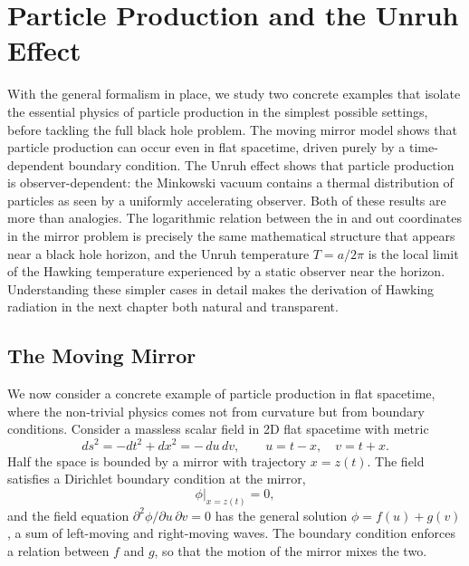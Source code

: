 \chapter{Particle Production and the Unruh Effect}
\label{ch:particle-production-unruh}
With the general formalism in place, we study two concrete examples
that isolate the essential physics of particle production in the
simplest possible settings, before tackling the full black hole
problem. The moving mirror model shows that particle production can
occur even in flat spacetime, driven purely by a time-dependent
boundary condition. The Unruh effect shows that particle production is
observer-dependent: the Minkowski vacuum contains a thermal
distribution of particles as seen by a uniformly accelerating observer.
Both of these results are more than analogies. The logarithmic relation
between the in and out coordinates in the mirror problem is precisely
the same mathematical structure that appears near a black hole horizon,
and the Unruh temperature $T = a/2\pi$ is the local limit of the
Hawking temperature experienced by a static observer near the horizon.
Understanding these simpler cases in detail makes the derivation of
Hawking radiation in the next chapter both natural and transparent.

\section{The Moving Mirror}

We now consider a concrete example of particle production in flat
spacetime, where the non-trivial physics comes not from curvature but
from boundary conditions. Consider a massless scalar field in 2D flat
spacetime with metric
\begin{equation}
	ds^2 = -dt^2 + dx^2 = -\,du\,dv,
	\qquad u = t-x,\quad v = t+x.
\end{equation}
Half the space is bounded by a mirror with trajectory $x = z(t)$. The
field satisfies a Dirichlet boundary condition at the mirror,
\begin{equation}
	\phi\big|_{x=z(t)} = 0,
\end{equation}
and the field equation $\partial^2\phi/\partial u\,\partial v = 0$
has the general solution $\phi = f(u) + g(v)$, a sum of left-moving
and right-moving waves. The boundary condition enforces a relation
between $f$ and $g$, so that the motion of the mirror mixes the two.


